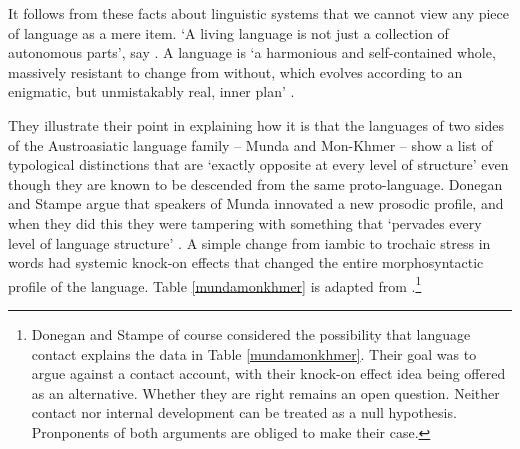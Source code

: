 It follows from these facts about linguistic systems that we cannot 
view any piece of language as a mere item. \textquoteleft A living language is not 
just a collection of autonomous parts', say \citet[1]{donegan_rhythm_1983}. A language is \textquoteleft a harmonious and self-contained whole, massively 
resistant to change from without, which evolves according to an 
enigmatic, but unmistakably real, inner plan' \citep[1]{donegan_rhythm_1983}. 



They illustrate their point in explaining how it is that the languages 
of two sides of the Austroasiatic language family -- Munda and 
Mon-Khmer -- show a list of typological distinctions that are \textquoteleft exactly 
opposite at every level of structure' \citep[111]{donegan_south-east_2002} 
even though they are known to be descended from the same proto-language. Donegan and Stampe argue that speakers of Munda innovated a new prosodic profile, and when they did this they 
were tampering with something that \textquoteleft pervades every level of language 
structure' \citep[14]{donegan_rhythm_1983}. A simple change from iambic to trochaic stress in words had systemic knock-on effects that changed the entire morphosyntactic profile of the language. Table \ref{mundamonkhmer}
is adapted from \citet[1--2]{donegan_rhythm_1983}.\footnote{Donegan and Stampe of course considered the possibility that language contact explains the data in Table \ref{mundamonkhmer}. Their goal was to argue against a contact account, with their knock-on effect idea being offered as an alternative. Whether they are right remains an open question. Neither contact nor internal development can be treated as a null hypothesis. Pronponents of both arguments are obliged to make their case.}



